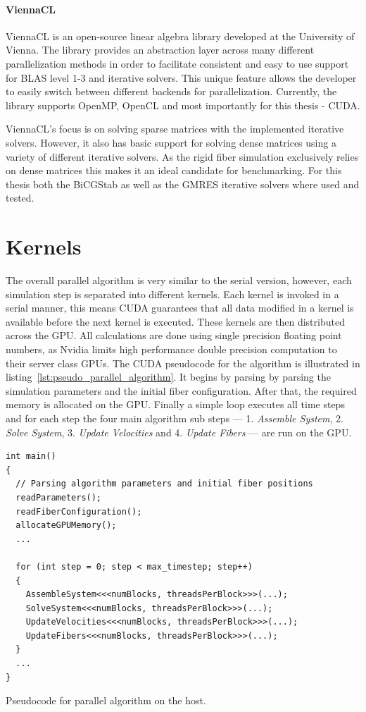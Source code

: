 \documentclass[a4paper,11pt]{kth-mag}
\begin{document}
\paragraph{ViennaCL}
ViennaCL is an open-source linear algebra library developed at the University of Vienna. The library provides an abstraction layer across many different parallelization methods in order to facilitate consistent and easy to use support for BLAS level 1-3 and iterative solvers. This unique feature allows the developer to easily switch between different backends for parallelization. Currently, the library supports OpenMP, OpenCL and most importantly for this thesis - CUDA.

ViennaCL's focus is on solving sparse matrices with the implemented iterative solvers. However, it also has basic support for solving dense matrices using a variety of different iterative solvers. As the rigid fiber simulation exclusively relies on dense matrices this makes it an ideal candidate for benchmarking. For this thesis both the BiCGStab as well as the GMRES iterative solvers where used and tested.

\section{Kernels}
\label{sec:kernels}

The overall parallel algorithm is very similar to the serial version, however, each simulation step is separated into different kernels. Each kernel is invoked in a serial manner, this means CUDA guarantees that all data modified in a kernel is available before the next kernel is executed. These kernels are then distributed across the GPU. All calculations are done using single precision floating point numbers, as Nvidia limits high performance double precision computation to their server class GPUs. The CUDA pseudocode for the algorithm is illustrated in listing~\ref{lst:pseudo_parallel_algorithm}. It begins by parsing by parsing the simulation parameters and the initial fiber configuration. After that, the required memory is allocated on the GPU. Finally a simple loop executes all time steps and for each step the four main algorithm sub steps — 1. \emph{Assemble System}, 2. \emph{Solve System}, 3. \emph{Update Velocities} and 4. \emph{Update Fibers} — are run on the GPU.

\begin{listing}[!htbp]
  \centering
  \begin{verbatim}
int main()
{
  // Parsing algorithm parameters and initial fiber positions
  readParameters();
  readFiberConfiguration();
  allocateGPUMemory();
  ...

  for (int step = 0; step < max_timestep; step++)
  {
    AssembleSystem<<<numBlocks, threadsPerBlock>>>(...);
    SolveSystem<<<numBlocks, threadsPerBlock>>>(...);
    UpdateVelocities<<<numBlocks, threadsPerBlock>>>(...);
    UpdateFibers<<<numBlocks, threadsPerBlock>>>(...);
  }
  ...
}
  \end{verbatim}
  \caption{Pseudocode for parallel algorithm on the host.}
  \label{lst:pseudo_parallel_algorithm}
\end{listing}
\end{document}
